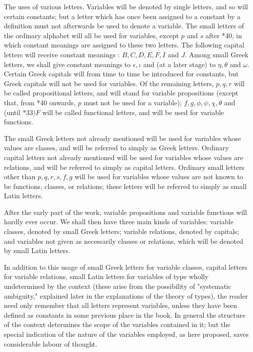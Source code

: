 \documentclass[10pt]{article}
\begin{document}
The uses of various letters. Variables will be denoted by single letters, and so will certain constants; but a letter which has once been assigned to a constant by a definition must not afterwards be used to denote a variable. The small letters of the ordinary alphabet will all be used for variables, except $p$ and $s$ after *40, in which constant meanings are assigned to these two letters. The following capital letters will receive constant meanings : $B, C, D, E, F, I$ and $J$. Among small Greek letters, we shall give constant meanings to $\epsilon, \iota$ and (at a later stage) to $\eta, \theta$ and $\omega$. Certain Greek capitals will from time to time be introduced for constants, but Greek capitals will not be used for variables. Of the remaining letters, $p, q, r$ will be called propositional letters, and will stand for variable propositions (except that, from *40 onwards, $p$ must not be used for a variable); $f, g, \phi, \psi, \chi, \theta$ and (until $* 33) F$ will be called functional letters, and will be used for variable functions.

The small Greek letters not already mentioned will be used for variables whose values are classes, and will be referred to simply as Greek letters. Ordinary capital letters not already mentioned will be used for variables whose values are relations, and will be referred to simply as capital letters. Ordinary small letters other than $p, q, r, s, f, g$ will be used for variables whose values are not known to be functions, classes, or relations; these letters will be referred to simply as small Latin letters.

After the early part of the work, variable propositions and variable functions will hardly ever occur. We shall then have three main kinds of variables: variable classes, denoted by small Greek letters; variable relations, denoted by capitals; and variables not given as necessarily classes or relations, which will be denoted by small Latin letters.

In addition to this usage of small Greek letters for variable classes, capital letters for variable relations, small Latin letters for variables of type wholly undetermined by the context (these arise from the possibility of "systematic ambiguity," explained later in the explanations of the theory of types), the reader need only remember that all letters represent variables, unless they have been defined as constants in some previous place in the book. In general the structure of the context determines the scope of the variables contained in it; but the special indication of the nature of the variables employed, as here proposed, saves considerable labour of thought.
\end{document}
